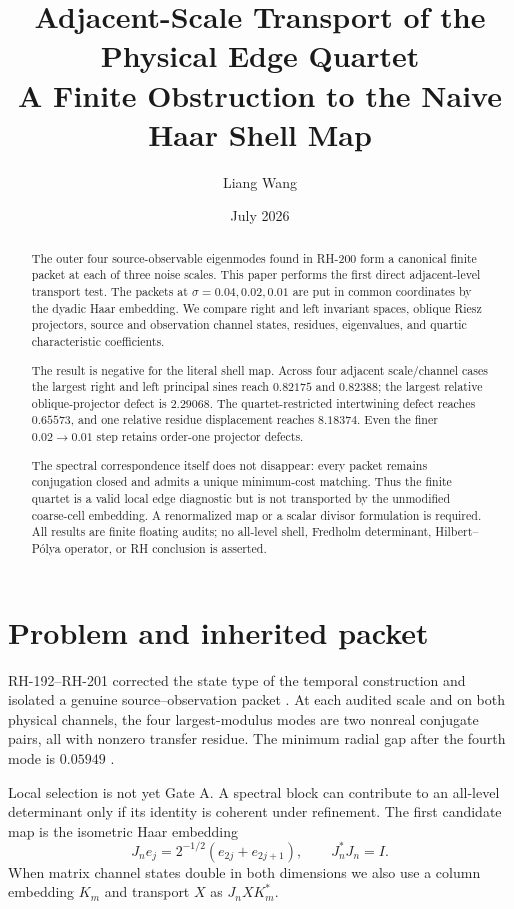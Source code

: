 \documentclass[12pt]{article}
\title{Adjacent-Scale Transport of the Physical Edge Quartet\\
\large A Finite Obstruction to the Naive Haar Shell Map}
\author{Liang Wang}
\date{July 2026}
\theoremstyle{remark}
\begin{document}
\maketitle

\begin{abstract}
The outer four source-observable eigenmodes found in RH-200 form a canonical
finite packet at each of three noise scales.  This paper performs the first
direct adjacent-level transport test.  The packets at
$\sigma=0.04,0.02,0.01$ are put in common coordinates by the dyadic Haar
embedding.  We compare right and left invariant spaces, oblique Riesz
projectors, source and observation channel states, residues, eigenvalues,
and quartic characteristic coefficients.

The result is negative for the literal shell map.  Across four adjacent
scale/channel cases the largest right and left principal sines reach
$0.82175$ and $0.82388$; the largest relative oblique-projector defect is
$2.29068$.  The quartet-restricted intertwining defect reaches $0.65573$,
and one relative residue displacement reaches $8.18374$.  Even the finer
$0.02\to0.01$ step retains order-one projector defects.

The spectral correspondence itself does not disappear: every packet remains
conjugation closed and admits a unique minimum-cost matching.  Thus the
finite quartet is a valid local edge diagnostic but is not transported by
the unmodified coarse-cell embedding.  A renormalized map or a scalar
divisor formulation is required.  All results are finite floating audits;
no all-level shell, Fredholm determinant, Hilbert--P\'olya operator, or RH
conclusion is asserted.
\end{abstract}

\section{Problem and inherited packet}

RH-192--RH-201 corrected the state type of the temporal construction and
isolated a genuine source--observation packet \citep{WangRH201}.  At each
audited scale and on both physical channels, the four largest-modulus modes
are two nonreal conjugate pairs, all with nonzero transfer residue.  The
minimum radial gap after the fourth mode is $0.05949$ \citep{WangRH200}.

Local selection is not yet Gate A.  A spectral block can contribute to an
all-level determinant only if its identity is coherent under refinement.
The first candidate map is the isometric Haar embedding
\begin{equation}\label{eq:haar}
 J_ne_j=2^{-1/2}(e_{2j}+e_{2j+1}),
 \qquad J_n^*J_n=I.
\end{equation}
When matrix channel states double in both dimensions we also use a column
embedding $K_m$ and transport $X$ as $J_nXK_m^*$.
\end{document}
